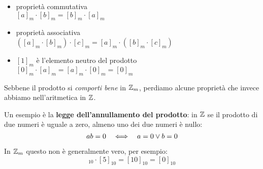 \begin{teorema}
    \begin{itemize}
        \item proprietà commutativa \\ $[a]_m \cdot [b]_m = [b]_m \cdot [a]_m$
        \item proprietà associativa \\ $([a]_m \cdot [b]_m) \cdot [c]_m = [a]_m \cdot ([b]_m \cdot [c]_m)$
        \item $[1]_m$ è l'elemento neutro del prodotto \\ $[0]_m \cdot [a]_m = [a]_m \cdot [0]_m = [0]_m$
    \end{itemize}
\end{teorema}

Sebbene il prodotto si \emph{comporti bene} in $ \mathbb{Z} _m$, perdiamo alcune proprietà che invece
abbiamo nell'aritmetica in $ \mathbb{Z} $.

Un esempio è la \textbf{legge dell'annullamento del prodotto}: in $ \mathbb{Z} $ se il prodotto di due numeri è uguale a zero,
almeno uno dei due numeri è nullo:
\begin{equation*}
    ab = 0  \quad\Longleftrightarrow\quad  a = 0 \lor b = 0
\end{equation*}

In $ \mathbb{Z} _m$ questo non è generalmente vero, per esempio:
\begin{equation*}
    [2]_{10} \cdot [5]_{10} = [10]_{10} = [0]_{10}
\end{equation*}
